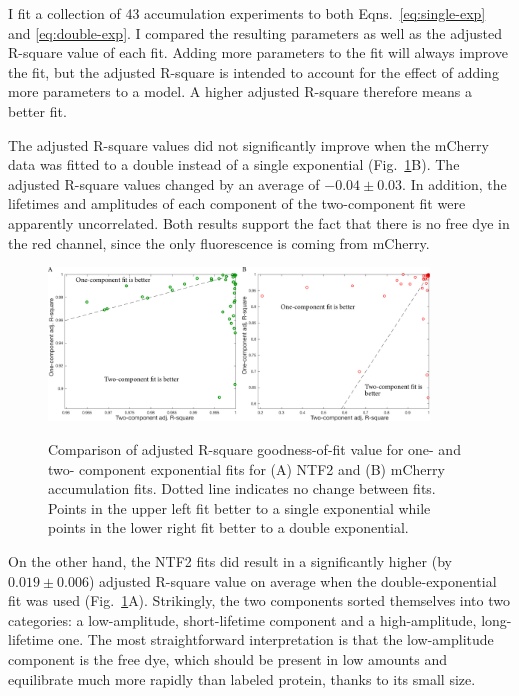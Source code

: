 I fit a collection of 43 accumulation experiments to both Eqns.~\ref{eq:single-exp} and \ref{eq:double-exp}.  I compared the resulting parameters as well as the adjusted R-square value of each fit.  Adding more parameters to the fit will always improve the fit, but the adjusted R-square is intended to account for the effect of adding more parameters to a model.  A higher adjusted R-square therefore means a better fit.

The adjusted R-square values did not significantly improve when the mCherry data was fitted to a double instead of a single exponential (Fig.~\ref{fig:free-dye-gof}B).  The adjusted R-square values changed by an average of $-0.04\pm0.03$.  In addition, the lifetimes and amplitudes of each component of the two-component fit were apparently uncorrelated.  Both results support the fact that there is no free dye in the red channel, since the only fluorescence is coming from mCherry.
\begin{figure} %
\caption[Comparison of single and double exponential fits for free-dye analysis.]{Comparison of adjusted R-square goodness-of-fit value for one- and two- component exponential fits for (A) NTF2 and (B) mCherry accumulation fits.  Dotted line indicates no change between fits.  Points in the upper left fit better to a single exponential while points in the lower right fit better to a double exponential.}
\centering
\includegraphics[width=0.9\textwidth]{figs/ch03/free-dye-gof}
\label{fig:free-dye-gof}
\end{figure} 

On the other hand, the NTF2 fits did result in a significantly higher (by $0.019\pm0.006$) adjusted R-square value on average when the double-exponential fit was used (Fig.~\ref{fig:free-dye-gof}A).  Strikingly, the two components sorted themselves into two categories: a low-amplitude, short-lifetime component and a high-amplitude, long-lifetime one.  The most straightforward interpretation is that the low-amplitude component is the free dye, which should be present in  low amounts and equilibrate much more rapidly than labeled protein, thanks to its small size.

